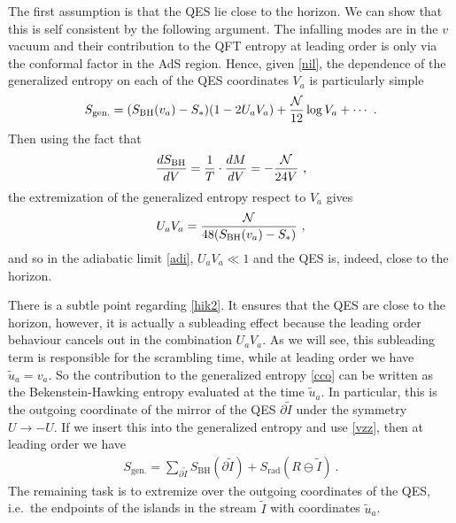 \documentclass[12pt]{article}
\newcommand\SBH{S_\text{BH}}
\newcommand{\EQ}[1]{\begin{equation}\begin{split} #1
\end{split}\end{equation}}
\begin{document}
The first assumption is that the QES lie close to the horizon. We can show that this is self consistent by  the following argument. The infalling modes are in the $v$ vacuum and their contribution to the QFT entropy at leading order is only via the conformal factor in the AdS region. Hence, given \eqref{nil}, the dependence of the generalized entropy on each of the QES coordinates $V_a$ is particularly simple
\EQ{
S_\text{gen.}=(\SBH (v_a)-S_*)(1-2U_aV_a)+\frac{\cal N}{12}\log V_a+\cdots\ .
\label{cco}
}
Then using  the fact that
\EQ{
\frac{d\SBH }{dV}=\frac1T\cdot\frac{dM}{dV}=-\frac{\cal N}{24V}\  ,
\label{nip2}
}
the extremization of the generalized entropy respect to $V_a$ gives
\EQ{
U_aV_a=\frac{\cal N}{48(\SBH (v_a)-S_*)}\ ,
\label{hik2}
}
and so in the adiabatic limit \eqref{adi}, $U_aV_a\ll1$ and the QES is, indeed, close to the horizon. 

 There is a subtle point regarding \eqref{hik2}. It ensures that the QES are close to the horizon, however, it is actually a subleading effect because the leading order behaviour cancels out in the combination $U_aV_a$. As we will see, this subleading term is responsible for the scrambling time, while at leading order we have  $\tilde u_a = v_a$. %
So the contribution to the generalized entropy \eqref{cco} can be written as the Bekenstein-Hawking entropy evaluated at the time $\tilde u_a$. In particular, this is the outgoing coordinate of the mirror of the QES $\partial\tilde I$ under the symmetry $U\to-U$. If we insert this into the generalized entropy and use \eqref{vzz}, then at leading order we have
\EQ{
S_\text{gen.}=\sum_{\partial\tilde I}\SBH (\partial\tilde I)+S_\text{rad}(R\ominus\tilde I)\ .
}
The remaining task is to extremize over the outgoing coordinates of the QES, i.e.~the endpoints of the islands in the stream $\tilde I$ with coordinates $\tilde u_a$.
\end{document}
